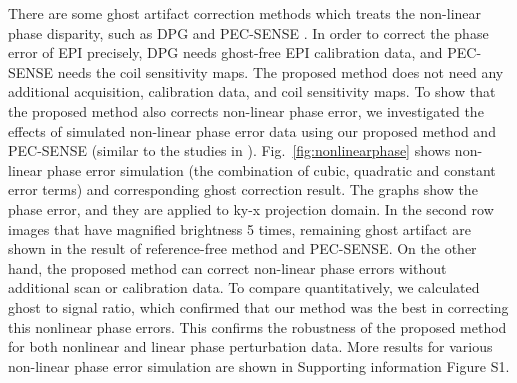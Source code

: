 \documentclass[num-refs]{wiley-article}
\newcommand{\0}{{\boldsymbol{0}}}
\newcommand{\1}{\blmath{1}}
\begin{document}
	
	There are some ghost artifact correction methods which treats the non-linear phase disparity, such as DPG \cite{Hoge2016dual} and PEC-SENSE \cite{xie2018robust}. In order to correct the phase error of EPI precisely, DPG needs ghost-free EPI calibration data, and PEC-SENSE needs the  coil sensitivity maps. The proposed method does not need any additional acquisition, calibration data, and coil sensitivity maps. To show that the proposed method also corrects non-linear phase error, we  investigated the effects of simulated non-linear phase error data  using our proposed method and PEC-SENSE (similar to the studies in  \cite{Hoge2016dual}). Fig.~\ref{fig:nonlinearphase} shows non-linear phase error simulation (the combination of cubic, quadratic and constant error terms) and corresponding ghost correction result. The graphs show the phase error, and they are applied to ky-x projection domain. In the second row images that have magnified brightness 5 times, remaining ghost artifact are shown in the result of reference-free method and PEC-SENSE. On the other hand, the proposed method can correct non-linear phase errors without additional scan or calibration data. To compare quantitatively, we calculated ghost to signal ratio, which confirmed that our method was the best in correcting this nonlinear phase errors. This confirms the robustness of the proposed method for both nonlinear and linear phase perturbation data. More results for various non-linear phase error simulation are shown in Supporting information Figure S1. %
	
\end{document}
